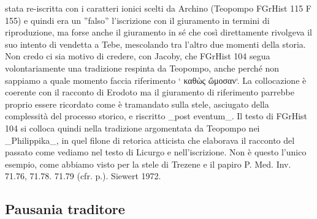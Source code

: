 stata re-iscritta con i caratteri ionici scelti da Archino (Teopompo FGrHist 115 F 155) e quindi era un ''falso'' l'iscrizione con il giuramento in termini di riproduzione, ma forse anche il giuramento in sé che così direttamente rivolgeva il suo intento di vendetta a Tebe, mescolando tra l'altro due momenti della storia. Non credo ci sia motivo di credere, con Jacoby, che FGrHist 104 segua volontariamente una tradizione respinta da Teopompo, anche perché non sappiamo a quale momento faccia riferimento ` καθὼς ὤμοσαν`. La collocazione è coerente con il racconto di Erodoto ma il giuramento di riferimento parrebbe proprio essere ricordato come è tramandato sulla stele, asciugato della complessità del processo storico, e riscritto _post eventum_. Il testo di FGrHist 104 si colloca quindi nella tradizione argomentata da Teopompo  nei _Philippika_, in quel filone di retorica atticista che elaborava il racconto del passato come vediamo nel testo di Licurgo  e nell'iscrizione. Non è questo l'unico esempio, come abbiamo visto per la stele di Trezene e il papiro P. Med. Inv. 71.76, 71.78. 71.79 (cfr. p.). Siewert 1972.
        \subsection*{Pausania traditore}
